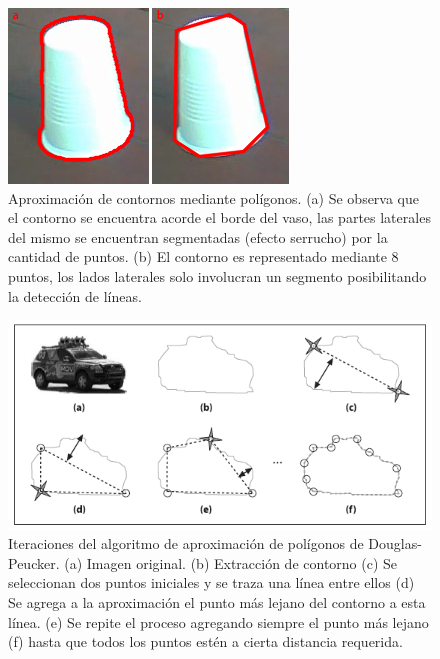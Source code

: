 \begin{figure}[htpb]
\begin{center}
  \includegraphics[scale=0.8]{figuras/polyaprox.png}
\end{center}
  \caption{\small Aproximación de contornos mediante polígonos. (a) Se observa que el contorno se encuentra acorde el borde del vaso, las
  partes laterales del mismo se encuentran segmentadas (efecto serrucho) por la cantidad de puntos. (b) El contorno es representado mediante
  8 puntos, los lados laterales solo involucran un segmento posibilitando la detección de líneas.}
  \label{fig:polyVasos}
\end{figure}

\begin{figure}[htpb]
\begin{center}
  \includegraphics[scale=0.6]{figuras/douglas-pecker.png}
\end{center}
  \caption{\small Iteraciones del algoritmo de aproximación de polígonos de Douglas-Peucker. (a) Imagen original. (b) Extracción de contorno
  (c) Se seleccionan dos puntos iniciales y se traza una línea entre ellos (d) Se agrega a la aproximación el punto más lejano del contorno a esta línea.
  (e) Se repite el proceso agregando siempre el punto más lejano (f) hasta que todos los puntos estén a cierta distancia requerida.}
  \label{fig:polyaprox}
\end{figure}

